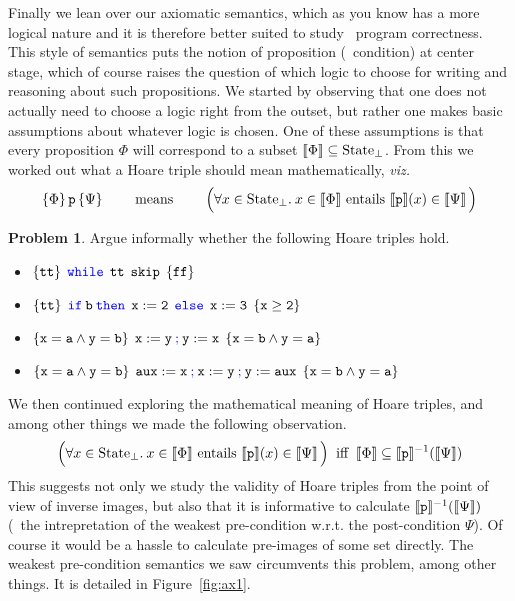 \documentclass[a4paper, 11pt]{article}
\theoremstyle{definition}
\newtheorem{problem}{Problem}
\newcommand{\blue}[1]{\textcolor{blue}{#1}}
\begin{document}
Finally we lean over our axiomatic semantics, which as you know has a more
logical nature and it is therefore better suited to study \eg\ program
correctness.  This style of semantics puts the notion of proposition (\ie\
condition) at center stage, which of course raises the question of which logic
to choose for writing and reasoning about such propositions.  We started by
observing that one does not actually need to choose a logic right from the
outset, but rather one makes basic assumptions about whatever logic is chosen.
One of these assumptions is that every proposition $\Phi$ will correspond to a
subset $\llbracket \Phi \rrbracket \subseteq \mathrm{State}_\bot$. From this we worked out what
a Hoare triple should mean mathematically, \emph{viz.}
\[
         \{ \Phi \} \, \mathtt{p} \, \{ \Psi \} \qquad \text{ means } \qquad 
         \Big (\forall x \in \mathrm{State}_\bot. \> x \in \llbracket \Phi \rrbracket 
         \text{ entails } \llbracket \mathtt{p} \rrbracket(x) \in \llbracket \Psi \rrbracket \, \Big )
\]

\begin{problem}
        Argue informally whether the following Hoare triples hold.
        \begin{itemize}
                \item $\{ \prog{tt} \} \> \> \prog{\blue{ while} \> \> tt \> \> skip} \> \> \{ \prog{ff} \}$
                \item $\{ \prog{tt} \} \> \> \prog{\blue{ if} \>  b \> \blue{ then} \> \> 
                        x:=2 \> \> \blue{ else} \> \> x:= 3} \> \> \{ \prog{x \geq 2} \}$
                \item $\{ \prog{x = a \wedge y = b} \} \> \>
                        \prog{x:= y \> \blue{ ;} \> y := x} \> \> \{ \prog{ x = b \wedge y = a }\}$
                \item $\{ \prog{x = a \wedge y = b} \} \> \>
                        \prog{aux := x \> \blue{ ;} \> 
                        x:= y \> \blue{ ;} \> y := aux} \> \> \{ \prog{ x = b \wedge y = a }\}$
        \end{itemize}
\end{problem}

We then continued exploring the mathematical meaning of Hoare triples, and
among other things we made the following observation.
\[
         \Big (\forall x \in \mathrm{State}_\bot. \> x \in \llbracket \Phi \rrbracket 
         \text{ entails } \llbracket \mathtt{p} \rrbracket(x) \in \llbracket \Psi \rrbracket \, \Big )
         \> \text{ iff } \>
         \llbracket \Phi \rrbracket \subseteq \llbracket \mathtt{p} \rrbracket^{-1}(\llbracket \Psi \rrbracket)
\]
This suggests not only we study the validity of Hoare triples from the point of
view of inverse images, but also that it is informative to calculate
$\llbracket \mathtt{p} \rrbracket^{-1}(\llbracket \Psi \rrbracket)$ (\ie\ the intrepretation of the weakest
pre-condition w.r.t. the post-condition $\Psi$). Of course it would be a hassle
to calculate pre-images of some set directly. The weakest pre-condition
semantics we saw circumvents this problem, among other things. It is detailed
in Figure~\ref{fig:ax1}.
\end{document}
